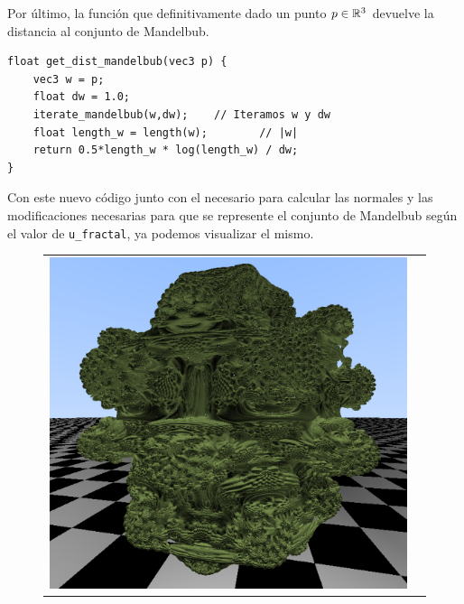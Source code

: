 Por último, la función que definitivamente dado un punto $p\in\mathbb{R}^3$ devuelve la distancia al conjunto de Mandelbub. 

\begin{lstlisting}
float get_dist_mandelbub(vec3 p) {
    vec3 w = p;
    float dw = 1.0;
    iterate_mandelbub(w,dw);    // Iteramos w y dw
    float length_w = length(w);        // |w|
    return 0.5*length_w * log(length_w) / dw;
}
\end{lstlisting}

Con este nuevo código junto con el necesario para calcular las normales y las modificaciones necesarias para que se represente el conjunto de Mandelbub según el valor de \verb|u_fractal|, ya podemos visualizar el mismo. 

\begin{figure}[ht]
    \centering
    \begin{tabular}{cc}
        \includegraphics[scale=0.34]{img/C8/mandelbub-1.png} &

\end{tabular}
\end{figure}
